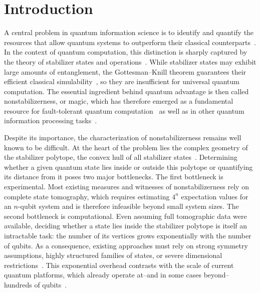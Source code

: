 \documentclass[10pt,aps,pra,twocolumn,floatfix,nofootinbib,superscriptaddress,longbibliography]{revtex4-2}
\newcommand{\1}{\mathbbm{1}}
\begin{document}
\maketitle


\section{Introduction}
A central problem in quantum information science is to identify and quantify the resources that allow quantum systems to outperform their classical counterparts~\cite{nielsen2010quantum, wilde2013quantum}. In the context of quantum computation, this distinction is sharply captured by the theory of stabilizer states and operations~\cite{gottesman1997stabilizer}. While stabilizer states may exhibit large amounts of entanglement, the Gottesman–Knill theorem guarantees their efficient classical simulability~\cite{gottesman1998heisenberg, aaronson2004improved}, so they are insufficient for universal quantum computation. The essential ingredient behind quantum advantage is then called nonstabilizerness, or magic, which has therefore emerged as a fundamental resource for fault-tolerant quantum computation~\cite{bravyi2005universal} as well as in other quantum information processing tasks~\cite{gu2024pseudomagic,cao2025gravitational,zamora2025semi,junior2025athermality,loio2025quantum}.

Despite its importance, the characterization of nonstabilizerness remains well known to be difficult. At the heart of the problem lies the complex geometry of the stabilizer polytope, the convex hull of all stabilizer states~\cite{Veitch_2014}. Determining whether a given quantum state lies inside or outside this polytope or quantifying its distance from it poses two major bottlenecks. The first bottleneck is experimental. Most existing measures and witnesses of nonstabilizerness rely on complete state tomography, which requires estimating $4^n$ expectation values for an $n$-qubit system and is therefore infeasible beyond small system sizes. The second bottleneck is computational. Even assuming full tomographic data were available, deciding whether a state lies inside the stabilizer polytope is itself an intractable task: the number of its vertices grows exponentially with the number of qubits. As a consequence, existing approaches must rely on strong symmetry assumptions, highly structured families of states, or severe dimensional restrictions~\cite{heinrich2019robustness, timsina2025robustness}. This exponential overhead contrasts with the scale of current quantum platforms, which already operate at--and in some cases beyond--hundreds of qubits~\cite{Arute2019,Zhong2020,Ebadi2021,Wu2021}.
\end{document}
